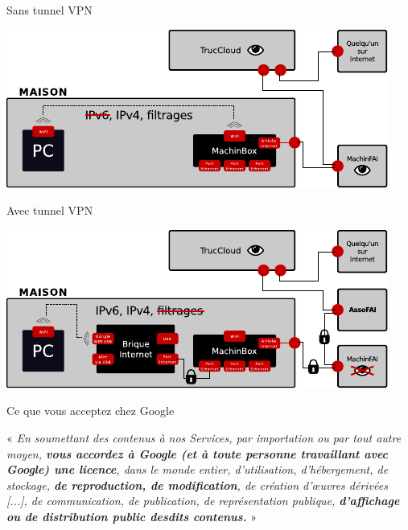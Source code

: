 \documentclass[notes=hide]{beamer}
\begin{document}
\begin{frame}[t]{Sans tunnel VPN}
\begin{center}
\vfill
\includegraphics[width=.9\textwidth]{img/schema1.pdf}
\vfill
\end{center}
\end{frame}

\begin{frame}[t]{Avec tunnel VPN}
\begin{center}
\vfill
\includegraphics[width=.9\textwidth]{img/schema5.pdf}
\vfill
\end{center}
\end{frame}


\begin{frame}[t]{Ce que vous acceptez chez Google}
	\vspace{4mm}
	\begin{justify}
	« \emph{En soumettant des contenus à nos Services, par importation ou par tout autre moyen, \textbf{vous accordez à Google (et à toute personne travaillant avec Google) une licence}, dans le monde entier, d'utilisation, d'hébergement, de stockage, \textbf{de reproduction, de modification}, de création d’œuvres dérivées [...], de communication, de publication, de représentation publique, \textbf{d'affichage ou de distribution public desdits contenus.}} »\\
	\end{justify}
\end{frame}

\end{document}
